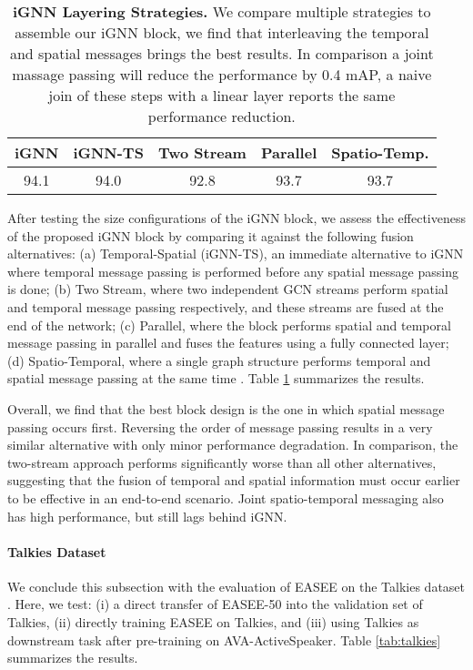 \documentclass[10pt,twocolumn,letterpaper]{article}
\begin{document}
 \begin{table}[t]
    \centering
    \footnotesize
    \begin{tabular}{c c c c c}
    	\toprule
        \textbf{iGNN} & \textbf{iGNN-TS}  & \textbf{Two Stream} & \textbf{Parallel}  & \textbf{Spatio-Temp.} \cite{leon2021maas} \\
        \midrule
        94.1 & 94.0 & 92.8 & 93.7 & 93.7 \\
    	\toprule
    \end{tabular}
    \caption{
        \textbf{iGNN Layering Strategies.} We compare multiple strategies to assemble our iGNN block, we find that interleaving the temporal and spatial messages brings the best results. In comparison a joint massage passing will reduce the performance by 0.4 mAP, a naive join of these steps with a linear layer reports the same performance reduction.
    }
    \label{tab:ignn_style}
\end{table} 
After testing the size configurations of the iGNN block, we assess the effectiveness of the proposed iGNN block by comparing it against the following fusion alternatives: (a) Temporal-Spatial (iGNN-TS), an immediate alternative to iGNN where temporal message passing is performed before any spatial message passing is done; (b) Two Stream, where two independent GCN streams  perform spatial and  temporal message passing respectively, and  these streams are fused at the end of the network; (c) Parallel, where the block performs spatial and temporal message passing in parallel and fuses the features using a fully connected layer; (d) Spatio-Temporal, where a single graph structure performs temporal and spatial message passing at the same time \cite{leon2021maas}. Table \ref{tab:ignn_style} summarizes the results.


Overall, we find that the best block design is the one in which spatial message passing occurs first. Reversing the order of message passing results in a very similar alternative with only minor performance degradation. In comparison, the two-stream approach performs significantly worse than all other alternatives, suggesting that the fusion of temporal and spatial information must occur earlier to be effective in an end-to-end scenario. Joint spatio-temporal messaging also has high performance, but still lags behind iGNN.

\vspace{-0.25cm}
\paragraph{Talkies Dataset} We conclude this subsection with the evaluation of EASEE on the Talkies dataset \cite{leon2021maas}. Here, we test: (i) a direct transfer of EASEE-50 into the validation set of Talkies, (ii) directly training EASEE on Talkies, and (iii) using Talkies as downstream task after pre-training on AVA-ActiveSpeaker. Table \ref{tab:talkies} summarizes the results.
\end{document}
